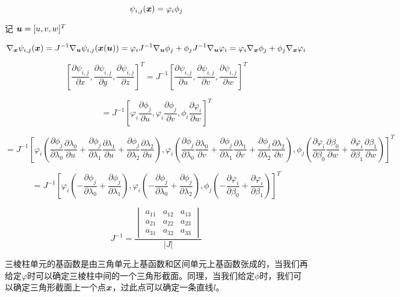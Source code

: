 \documentclass{article}
\begin{document}
$$
\psi_{i, j}(\boldsymbol x) = \varphi_i\phi_j
$$

记 $\boldsymbol u = [u, v, w]^T$

$$
\nabla_{\boldsymbol x} \psi_{i, j}(\boldsymbol x) = J^{-1} 
\nabla_{\boldsymbol u} \psi_{i, j}(\boldsymbol x(\boldsymbol u)) 
= \varphi_i J^{-1}\nabla_{\boldsymbol u}\phi_j + \phi_j J^{-1} \nabla_{\boldsymbol u}\varphi_i
= \varphi_i \nabla_{\boldsymbol x}\phi_j + \phi_j\nabla_{\boldsymbol x}\varphi_i
$$

$$
\left[\frac{\partial \psi_{i,j}}{\partial x},\frac{\partial \psi_{i,j}}{\partial y},\frac{\partial \psi_{i,j}}{\partial z}\right]^T=J^{-1}\left[\frac{\partial \psi_{i,j}}{\partial u},\frac{\partial \psi_{i,j}}{\partial v},\frac{\partial \psi_{i,j}}{\partial w}\right]^T
$$

$$
=J^{-1}\left[\varphi_i \frac{\partial \phi_j}{\partial u},\varphi_i \frac{\partial \phi_j}{\partial v},\phi_i \frac{\partial \varphi_i}{\partial w}\right]^T
$$

$$
=J^{-1}\left[\varphi_i(\frac{\partial \phi_j}{\partial \lambda_0}\frac{\partial \lambda_0}{\partial u}+\frac{\partial \phi_j}{\partial \lambda_1} \frac{\partial \lambda_1}{\partial u}+\frac{\partial \phi_j}{\partial \lambda_2} \frac{\partial \lambda_2}{\partial u}),
\varphi_i(\frac{\partial \phi_j}{\partial \lambda_0}\frac{\partial \lambda_0}{\partial v}+\frac{\partial \phi_j}{\partial \lambda_1} \frac{\partial \lambda_1}{\partial v}+\frac{\partial \phi_j}{\partial \lambda_2} \frac{\partial \lambda_2}{\partial v}),
\phi_j(\frac{\partial \varphi_i}{\partial \beta_0} \frac{\partial \beta_0}{\partial w}+\frac{\partial \varphi_i}{\partial \beta_1} \frac{\partial \beta_1}{\partial w})\right]^T
$$

$$
=J^{-1}\left[\varphi_i(-\frac{\partial \phi_j}{\partial \lambda_0}+\frac{\partial \phi_j}{\partial \lambda_1}),\varphi_i(-\frac{\partial \phi_j}{\partial \lambda_0}+\frac{\partial \phi_j}{\partial \lambda_2}),\phi_j(-\frac{\partial \varphi_i}{\partial \beta_0}+\frac{\partial \varphi_i}{\partial \beta_1})\right]^T
$$

$$J^{-1}=\frac{\begin{vmatrix}
a_{11} & a_{12} & a_{13}\\
a_{21} & a_{22} & a_{23}\\
a_{31} & a_{32} & a_{33}
\end{vmatrix}
}{|J|}$$

三棱柱单元的基函数是由三角单元上基函数和区间单元上基函数张成的，当我们再给定$\varphi$时可以确定三棱柱中间的一个三角形截面。同理，当我们给定$\phi$时，我们可以确定三角形截面上一个点$\boldsymbol x$，过此点可以确定一条直线$l$。
\end{document}
